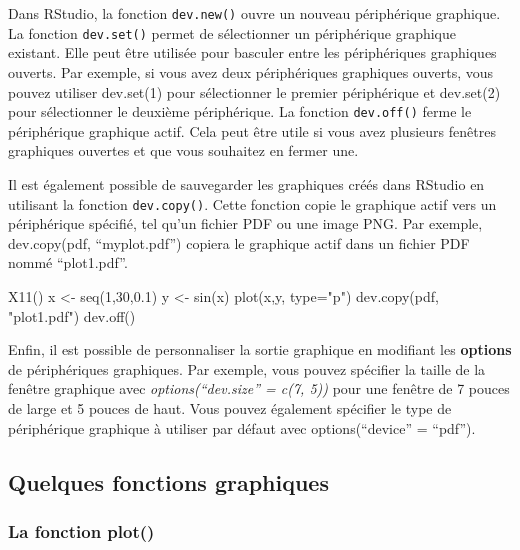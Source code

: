 \documentclass[
]{article}
\newenvironment{Shaded}{\begin{snugshade}}{\end{snugshade}}
\newcommand{\AttributeTok}[1]{\textcolor[rgb]{0.77,0.63,0.00}{#1}}
\newcommand{\DecValTok}[1]{\textcolor[rgb]{0.00,0.00,0.81}{#1}}
\newcommand{\FloatTok}[1]{\textcolor[rgb]{0.00,0.00,0.81}{#1}}
\newcommand{\FunctionTok}[1]{\textcolor[rgb]{0.00,0.00,0.00}{#1}}
\newcommand{\NormalTok}[1]{#1}
\newcommand{\OtherTok}[1]{\textcolor[rgb]{0.56,0.35,0.01}{#1}}
\newcommand{\StringTok}[1]{\textcolor[rgb]{0.31,0.60,0.02}{#1}}
\begin{document}
Dans RStudio, la fonction \texttt{dev.new()} ouvre un nouveau périphérique graphique. La fonction \texttt{dev.set()} permet de sélectionner un périphérique graphique existant. Elle peut être utilisée pour basculer entre les périphériques graphiques ouverts. Par exemple, si vous avez deux périphériques graphiques ouverts, vous pouvez utiliser dev.set(1) pour sélectionner le premier périphérique et dev.set(2) pour sélectionner le deuxième périphérique. La fonction \texttt{dev.off()} ferme le périphérique graphique actif. Cela peut être utile si vous avez plusieurs fenêtres graphiques ouvertes et que vous souhaitez en fermer une.

Il est également possible de sauvegarder les graphiques créés dans RStudio en utilisant la fonction \texttt{dev.copy()}. Cette fonction copie le graphique actif vers un périphérique spécifié, tel qu'un fichier PDF ou une image PNG. Par exemple, dev.copy(pdf, ``myplot.pdf'') copiera le graphique actif dans un fichier PDF nommé ``plot1.pdf''.

\begin{Shaded}
\begin{Highlighting}[]
\FunctionTok{X11}\NormalTok{()   }
\NormalTok{x }\OtherTok{\textless{}{-}} \FunctionTok{seq}\NormalTok{(}\DecValTok{1}\NormalTok{,}\DecValTok{30}\NormalTok{,}\FloatTok{0.1}\NormalTok{)}
\NormalTok{y }\OtherTok{\textless{}{-}} \FunctionTok{sin}\NormalTok{(x)}
\FunctionTok{plot}\NormalTok{(x,y, }\AttributeTok{type=}\StringTok{"p"}\NormalTok{)}
\FunctionTok{dev.copy}\NormalTok{(pdf, }\StringTok{"plot1.pdf"}\NormalTok{)}
\FunctionTok{dev.off}\NormalTok{()}
\end{Highlighting}
\end{Shaded}

Enfin, il est possible de personnaliser la sortie graphique en modifiant les \textbf{options} de périphériques graphiques. Par exemple, vous pouvez spécifier la taille de la fenêtre graphique avec \emph{options(``dev.size'' = c(7, 5))} pour une fenêtre de 7 pouces de large et 5 pouces de haut. Vous pouvez également spécifier le type de périphérique graphique à utiliser par défaut avec options(``device'' = ``pdf'').

\hypertarget{quelques-fonctions-graphiques}{%
\subsection{Quelques fonctions graphiques}\label{quelques-fonctions-graphiques}}

\hypertarget{la-fonction-plot}{%
\subsubsection{La fonction plot()}\label{la-fonction-plot}}
\end{document}
